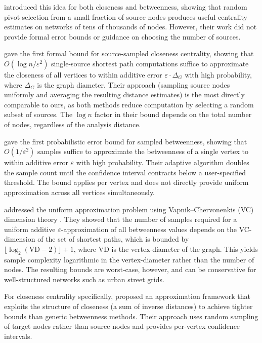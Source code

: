 \citet{Brandes2007} introduced this idea for both closeness and betweenness, showing that random pivot selection from a small fraction of source nodes produces useful centrality estimates on networks of tens of thousands of nodes. However, their work did not provide formal error bounds or guidance on choosing the number of sources.

\citet{Eppstein2004} gave the first formal bound for source-sampled closeness centrality, showing that $O(\log n / \varepsilon^2)$ single-source shortest path computations suffice to approximate the closeness of all vertices to within additive error $\varepsilon \cdot \Delta_G$ with high probability, where $\Delta_G$ is the graph diameter. Their approach (sampling source nodes uniformly and averaging the resulting distance estimates) is the most directly comparable to ours, as both methods reduce computation by selecting a random subset of sources. The $\log n$ factor in their bound depends on the total number of nodes, regardless of the analysis distance.

\citet{Bader2007} gave the first probabilistic error bound for sampled betweenness, showing that $O(1/\varepsilon^2)$ samples suffice to approximate the betweenness of a single vertex to within additive error $\varepsilon$ with high probability. Their adaptive algorithm doubles the sample count until the confidence interval contracts below a user-specified threshold. The bound applies per vertex and does not directly provide uniform approximation across all vertices simultaneously.

\citet{Riondato2016} addressed the uniform approximation problem using Vapnik--Chervonenkis (VC) dimension theory \citep{Vapnik1971}. They showed that the number of samples required for a uniform additive $\varepsilon$-approximation of all betweenness values depends on the VC-dimension of the set of shortest paths, which is bounded by $\lfloor \log_2 (\text{VD} - 2) \rfloor + 1$, where VD is the vertex-diameter of the graph. This yields sample complexity logarithmic in the vertex-diameter rather than the number of nodes. The resulting bounds are worst-case, however, and can be conservative for well-structured networks such as urban street grids.

For closeness centrality specifically, \citet{Cohen2014} proposed an approximation framework that exploits the structure of closeness (a sum of inverse distances) to achieve tighter bounds than generic betweenness methods. Their approach uses random sampling of target nodes rather than source nodes and provides per-vertex confidence intervals.

